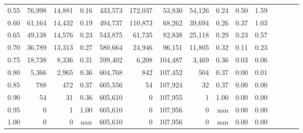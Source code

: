 \begin{tabular}{rrrcrrrrrrrrrrr}
0.55 &  76,998 &  14,881 &                                       0.16 &  433,573 &  172,037 &   53,830 &   54,126 &  0.24 &  0.50 &                         1.59 \\
0.60 &  61,164 &  14,432 &                                       0.19 &  494,737 &  110,873 &   68,262 &   39,694 &  0.26 &  0.37 &                         1.03 \\
0.65 &  49,138 &  14,576 &                                       0.23 &  543,875 &   61,735 &   82,838 &   25,118 &  0.29 &  0.23 &                         0.57 \\
0.70 &  36,789 &  13,313 &                                       0.27 &  580,664 &   24,946 &   96,151 &   11,805 &  0.32 &  0.11 &                         0.23 \\
0.75 &  18,738 &   8,336 &                                       0.31 &  599,402 &    6,208 &  104,487 &    3,469 &  0.36 &  0.03 &                         0.06 \\
0.80 &   5,366 &   2,965 &                                       0.36 &  604,768 &      842 &  107,452 &      504 &  0.37 &  0.00 &                         0.01 \\
0.85 &     788 &     472 &                                       0.37 &  605,556 &       54 &  107,924 &       32 &  0.37 &  0.00 &                         0.00 \\
0.90 &      54 &      31 &                                       0.36 &  605,610 &        0 &  107,955 &        1 &  1.00 &  0.00 &                         0.00 \\
0.95 &       0 &       1 &                                       1.00 &  605,610 &        0 &  107,956 &        0 &   nan &  0.00 &                         0.00 \\
1.00 &       0 &       0 &                                        nan &  605,610 &        0 &  107,956 &        0 &   nan &  0.00 &                         0.00 \\
\bottomrule
\end{tabular}
